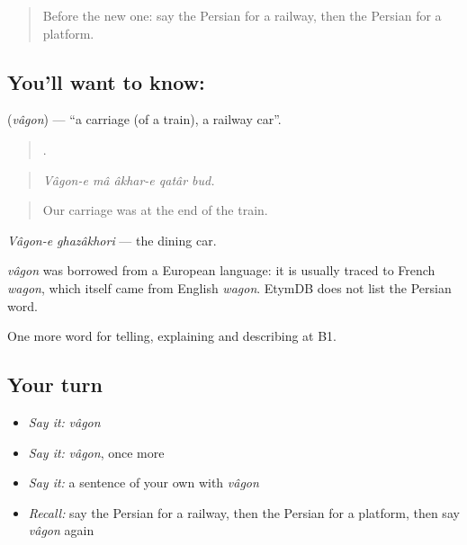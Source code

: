 \label{lesson:FA-C429-vagon}



\begin{quote}
Before the new one: say the Persian for a railway, then the Persian for a platform.
\end{quote}

\subsection*{You'll want to know: }
\textbf{} (\emph{vâgon}) — \textquotedblleft{}a carriage (of a train), a railway car\textquotedblright{}.

\begin{quote}
    .
\end{quote}

\begin{quote}
\emph{Vâgon-e mâ âkhar-e qatâr bud.}
\end{quote}

\begin{quote}
Our carriage was at the end of the train.
\end{quote}

\emph{Vâgon-e ghazâkhori} — the dining car.

\begin{cousinweb}
\emph{vâgon} was borrowed from a European language: it is usually traced to French \emph{wagon}, which itself came from English \emph{wagon}. EtymDB does not list the Persian word.
\end{cousinweb}

\begin{grammarlens}[title={What you've built}]
One more word for telling, explaining and describing at B1.
\end{grammarlens}

\subsection*{Your turn}
\begin{itemize}
\raggedright
  \item \emph{Say it:} \emph{vâgon}
  \item \emph{Say it:} \emph{vâgon}, once more
  \item \emph{Say it:} a sentence of your own with \emph{vâgon}
  \item \emph{Recall:} say the Persian for a railway, then the Persian for a platform, then say \emph{vâgon} again
\end{itemize}

